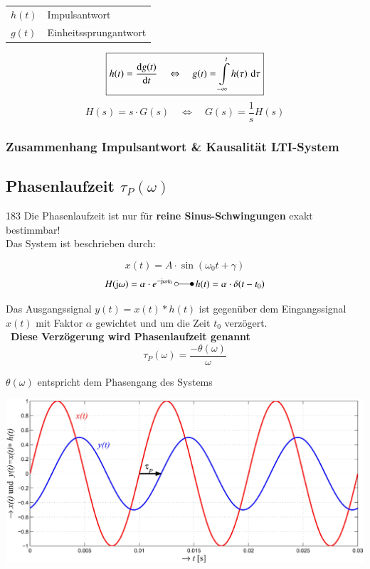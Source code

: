 \begin{tabular}{ll}
    $h(t)$ & Impulsantwort \\
    $g(t)$ & Einheitssprungantwort
\end{tabular}

$$ \boxed{ h(t) =  \frac{\mathop{} \! \mathrm{d} g(t)}{\mathop{} \! \mathrm{d} t}  \quad \Leftrightarrow \quad g(t) = \int\limits_{-\infty}^t  h(\tau) \, \mathop{} \! \mathrm{d} \tau }  $$
$$ \boxed{ H(s) = s \cdot G(s) \quad \Leftrightarrow \quad G(s) =  \frac{1}{s} H(s) }  $$


\subsubsection{Zusammenhang Impulsantwort \& Kausalität LTI-System}



\subsection{Phasenlaufzeit \texorpdfstring{$\tau_P(\omega)$}{tP(w)}}{183}
Die Phasenlaufzeit ist nur für \textbf{reine Sinus-Schwingungen} exakt bestimmbar! \\
Das System ist beschrieben durch:

$$ x(t) = A \cdot \sin(\omega_0 t + \gamma) $$
$$ H( \jimg \omega) = \alpha \cdot e^{- \jimg  \omega t_0} \, \laplace \, h(t) = \alpha \cdot \delta(t - t_0) $$


Das Ausgangssignal $y(t) = x(t) * h(t)$ ist gegenüber dem Eingangssignal $x(t)$ mit Faktor $\alpha$ gewichtet und 
um die Zeit $t_0$ verzögert. \\
\textrightarrow\ \textbf{Diese Verzögerung wird Phasenlaufzeit genannt}
$$ \boxed{ \tau_P(\omega) = \frac{- \theta(\omega)}{\omega} } $$

$ \theta(\omega)$ entspricht dem Phasengang des Systems 



\includegraphics[width=0.8\linewidth]{images/phasenlaufzeit.png}


